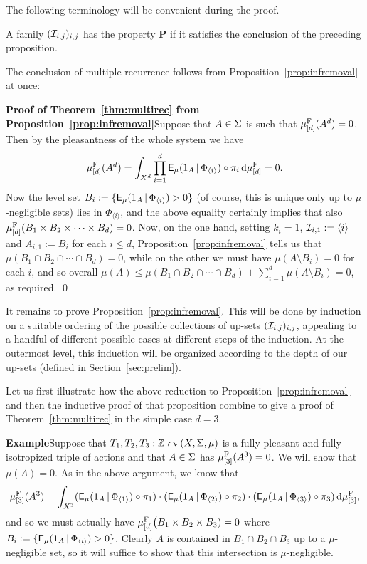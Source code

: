 \documentclass[12pt]{article}
\begin{document}
The following terminology will be convenient during the proof.

\begin{dfn}
A family $(\I_{i,j})_{i,j}$ has the property \textbf{P} if it
satisfies the conclusion of the preceding proposition.
\end{dfn}

The conclusion of multiple recurrence follows from
Proposition~\ref{prop:infremoval} at once:

\textbf{Proof of Theorem~\ref{thm:multirec} from
Proposition~\ref{prop:infremoval}}\quad Suppose that $A \in \S$ is
such that $\mu^{\rm{F}}_{[d]}(A^d) = 0$. Then by the pleasantness of
the whole system we have
\[\mu^{\rm{F}}_{[d]}(A^d) = \int_{X^d}\prod_{i=1}^d \sfE_{\mu}(1_A\,|\,\Phi_{\langle i\rangle})\circ\pi_i\,\d\mu^{\rm{F}}_{[d]} = 0.\]
Now the level set $B_i := \{\sfE_{\mu}(1_A\,|\,\Phi_{\langle
i\rangle})
> 0\}$ (of course, this is unique only up to $\mu$-negligible sets) lies in $\Phi_{\langle i\rangle}$, and the above equality certainly
implies that also $\mu^{\rm{F}}_{[d]}(B_1\times B_2\times
\cdots\times B_d) = 0$.  Now, on the one hand, setting $k_i=1$,
$\I_{i,1}:= \langle i\rangle$ and $A_{i,1} := B_i$ for each $i \leq
d$, Proposition~\ref{prop:infremoval} tells us that $\mu(B_1\cap
B_2\cap\cdots\cap B_d) = 0$, while on the other we must have
$\mu(A\setminus B_i) = 0$ for each $i$, and so overall $\mu(A) \leq
\mu(B_1\cap B_2\cap\cdots\cap B_d) + \sum_{i=1}^d\mu(A\setminus B_i)
= 0$, as required. \qed

It remains to prove Proposition~\ref{prop:infremoval}.  This will be
done by induction on a suitable ordering of the possible collections
of up-sets $(\I_{i,j})_{i,j}$, appealing to a handful of different
possible cases at different steps of the induction.  At the
outermost level, this induction will be organized according to the
depth of our up-sets (defined in Section~\ref{sec:prelim}).

Let us first illustrate how the above reduction to
Proposition~\ref{prop:infremoval} and then the inductive proof of
that proposition combine to give a proof of
Theorem~\ref{thm:multirec} in the simple case $d=3$.

\textbf{Example}\quad Suppose that $T_1,T_2,T_3:\bbZ\curvearrowright
(X,\S,\mu)$ is a fully pleasant and fully isotropized triple of
actions and that $A \in \S$ has $\mu^{\rm{F}}_{[3]}(A^3) = 0$.  We
will show that $\mu(A) = 0$.  As in the above argument, we know that
\[\mu^{\rm{F}}_{[3]}(A^3) = \int_{X^3}(\sfE_\mu(1_A\,|\,\Phi_{\langle 1\rangle})\circ\pi_1)\cdot(\sfE_\mu(1_A\,|\,\Phi_{\langle 2\rangle})\circ\pi_2)\cdot(\sfE_\mu(1_A\,|\,\Phi_{\langle 3\rangle})\circ\pi_3)\,\d\mu^{\rm{F}}_{[3]},\]
and so we must actually have $\mu^{\rm{F}}_{[d]}\big(B_1\times
B_2\times B_3) = 0$ where $B_i:= \{\sfE_\mu(1_A\,|\,\Phi_{\langle
i\rangle}) > 0\}$. Clearly $A$ is contained in $B_1\cap B_2\cap B_3$
up to a $\mu$-negligible set, so it will suffice to show that this
intersection is $\mu$-negligible.
\end{document}
